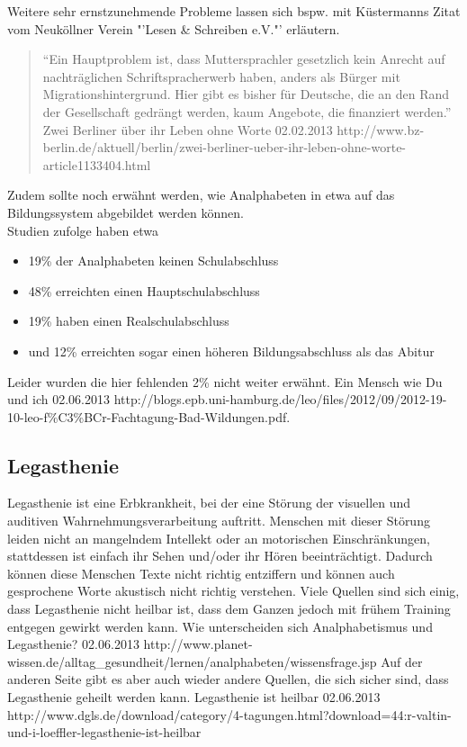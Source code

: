 Weitere sehr ernstzunehmende Probleme lassen sich bspw. mit Küstermanns Zitat vom Neuköllner Verein "'Lesen \& Schreiben e.V."' erläutern.


\begin{quote}
	"`Ein Hauptproblem ist, dass Muttersprachler gesetzlich
	kein Anrecht auf nachträglichen Schriftspracherwerb
	haben, anders als Bürger mit Migrationshintergrund. Hier
	gibt es bisher für Deutsche, die an den Rand der
	Gesellschaft gedrängt werden, kaum Angebote, die
	finanziert werden."'
				{Zwei Berliner über ihr Leben ohne Worte}
				{02.02.2013}
				{http://www.bz-berlin.de/aktuell/berlin/zwei-berliner-ueber-ihr-leben-ohne-worte-article1133404.html}
\end{quote}


Zudem sollte noch erwähnt werden, wie Analphabeten in etwa auf das Bildungssystem abgebildet werden können.\\
Studien zufolge haben etwa 

\begin{itemize}
	\item 19\% der Analphabeten keinen Schulabschluss
	\item 48\% erreichten einen Hauptschulabschluss
	\item 19\% haben einen Realschulabschluss
	\item und 12\% erreichten sogar einen höheren Bildungsabschluss als das Abitur
\end{itemize}

Leider wurden die hier fehlenden 2\% nicht weiter erwähnt.
				{Ein Mensch wie Du und ich}
				{02.06.2013}
				{http://blogs.epb.uni-hamburg.de/leo/files/2012/09/2012-19-10-leo-f\%C3\%BCr-Fachtagung-Bad-Wildungen.pdf.}



\subsection{Legasthenie}

Legasthenie ist eine Erbkrankheit, bei der eine Störung der visuellen und auditiven Wahrnehmungsverarbeitung auftritt. Menschen mit dieser Störung leiden nicht an mangelndem Intellekt oder an motorischen Einschränkungen, stattdessen ist einfach ihr Sehen und/oder ihr Hören beeinträchtigt. Dadurch können diese Menschen Texte nicht richtig entziffern und können auch gesprochene Worte akustisch nicht richtig verstehen. Viele Quellen sind sich einig, dass Legasthenie nicht heilbar ist, dass dem Ganzen jedoch mit frühem Training entgegen gewirkt werden kann. 
				{Wie unterscheiden sich Analphabetismus und Legasthenie?}
				{02.06.2013}
				{http://www.planet-wissen.de/alltag_gesundheit/lernen/analphabeten/wissensfrage.jsp}
Auf der anderen Seite gibt es aber auch wieder andere Quellen, die sich sicher sind, dass Legasthenie geheilt werden kann.
				{Legasthenie ist heilbar}
				{02.06.2013}
				{http://www.dgls.de/download/category/4-tagungen.html?download=44:r-valtin-und-i-loeffler-legasthenie-ist-heilbar}

